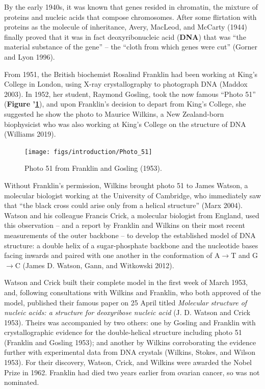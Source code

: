\documentclass[
]{book}
\begin{document}
By the early 1940s, it was known that genes resided in chromatin, the mixture of proteins and nucleic acids that compose chromosomes. After some flirtation with proteins as the molecule of inheritance, Avery, MacLeod, and McCarty (1944) finally proved that it was in fact deoxyribonucleic acid (\textbf{DNA}) that was ``the material substance of the gene'' -- the ``cloth from which genes were cut'' (Gorner and Lyon 1996).

From 1951, the British biochemist Rosalind Franklin had been working at King's College in London, using X-ray crystallography to photograph DNA (Maddox 2003). In 1952, her student, Raymond Gosling, took the now famous ``Photo 51'' (\textbf{Figure '\ref{fig:photo51}}), and upon Franklin's decision to depart from King's College, she suggested he show the photo to Maurice Wilkins, a New Zealand-born biophysicist who was also working at King's College on the structure of DNA (Williams 2019).



\begin{figure}

{\centering \texttt{[image: figs/introduction/Photo\_51]} 

}

\caption{Photo 51 from Franklin and Gosling (1953).}\label{fig:photo51}
\end{figure}

Without Franklin's permission, Wilkins brought photo 51 to James Watson, a molecular biologist working at the University of Cambridge, who immediately saw that ``the black cross could arise only from a helical structure'' (Marx 2004). Watson and his colleague Francis Crick, a molecular biologist from England, used this observation -- and a report by Franklin and Wilkins on their most recent measurements of the outer backbone -- to develop the established model of DNA structure: a double helix of a sugar-phosphate backbone and the nucleotide bases facing inwards and paired with one another in the conformation of A\(\rightarrow\)T and G\(\rightarrow\)C (James D. Watson, Gann, and Witkowski 2012).

Watson and Crick built their complete model in the first week of March 1953, and, following consultations with Wilkins and Franklin, who both approved of the model, published their famous paper on 25 April titled \emph{Molecular structure of nucleic acids: a structure for deoxyribose nucleic acid} (J. D. Watson and Crick 1953). Theirs was accompanied by two others: one by Gosling and Franklin with crystallographic evidence for the double-helical structure including photo 51 (Franklin and Gosling 1953); and another by Wilkins corroborating the evidence further with experimental data from DNA crystals (Wilkins, Stokes, and Wilson 1953). For their discovery, Watson, Crick, and Wilkins were awarded the Nobel Prize in 1962. Franklin had died two years earlier from ovarian cancer, so was not nominated.
\end{document}
